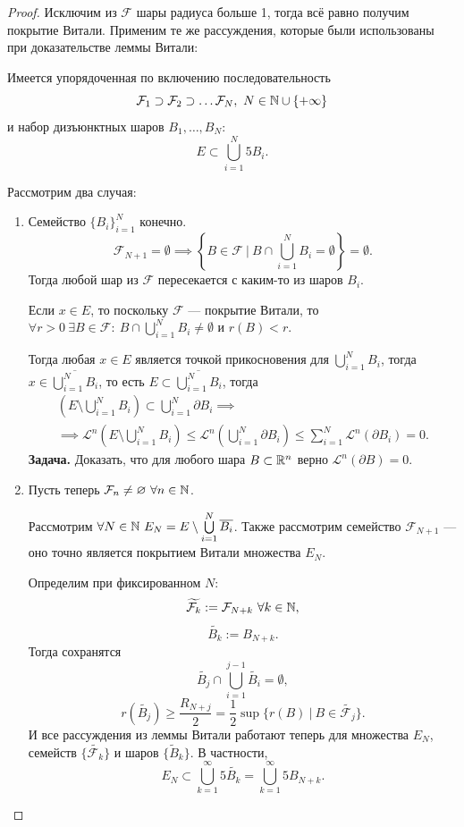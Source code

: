 \begin{proof}
    Исключим из $\mathcal{F}$ шары радиуса больше 1, тогда всё равно получим покрытие Витали.
    Применим те же рассуждения, которые были использованы при доказательстве леммы Витали:

    Имеется упорядоченная по включению последовательность
    \[\mathcal{F}_1 \supset \mathcal{F}_2 \supset \dots \mathcal{F}_N, \ N \in \mathbb{N} \cup \{+\infty\}\]
    и набор дизъюнктных шаров $B_1, \dots, B_N$:
    \[E \subset \bigcup\limits_{i=1}^{N} 5B_i.\]

    \noindent Рассмотрим два случая:
    \begin{enumerate}
        \item Семейство $\{B_i\}_{i=1}^N$ конечно.
        $$\mathcal{F}_{N+1} = \emptyset \implies \left\{B \in \mathcal{F} \ | \ B \cap \bigcup\limits_{i=1}^{N} B_i = \emptyset\right\} = \emptyset.$$
        Тогда любой шар из $\mathcal{F}$ пересекается с каким-то из шаров $B_i$.

        Если $x \in E$, то поскольку $\mathcal{F}$ — покрытие Витали, то $\forall r > 0 \ \exists B \in \mathcal{F}: \ B \cap \bigcup\limits_{i=1}^{N} B_i \neq \emptyset$ и $r(B) < r$.

        Тогда любая $x \in E$ является точкой прикосновения для $\bigcup\limits_{i=1}^{N}B_i$, тогда $x \in \overline{\bigcup\limits_{i=1}^{N}B_i}$, то есть $E \subset \overline{\bigcup\limits_{i=1}^{N}B_i}$, тогда
        \begin{multline*}
            \left(E \setminus \bigcup\limits_{i=1}^{N}B_i\right) \subset \bigcup\limits_{i=1}^{N} \partial B_i
            \implies\\\implies
            \mathcal{L}^n \left(E \setminus \bigcup\limits_{i=1}^{N}B_i\right) \leqslant \mathcal{L}^n \left(\bigcup\limits_{i=1}^{N} \partial B_i\right) \leqslant \sum\limits_{i=1}^{N} \mathcal{L}^n(\partial B_i) = 0.
        \end{multline*} 
        \noindent \textbf{Задача.} Доказать, что для любого шара $B \subset \mathbb{R}^n$ верно $\mathcal{L}^n(\partial B) = 0$.

        \item Пусть теперь $\mathcal{F}_n \neq \varnothing \ \forall n \in \mathbb{N}$.
        
        Рассмотрим $\forall N \in \mathbb{N} \ E_N = E \setminus \bigcup\limits_{i=1}^{N} \overline{B_i}$.
        Также рассмотрим семейство $\mathcal{F}_{N+1}$ — оно точно является покрытием Витали множества $E_N$.

        Определим при фиксированном $N$:
        \[\widetilde{\mathcal{F}_k} := \mathcal{F}_{N+k} \ \forall k \in \mathbb{N},\]
        \[\widetilde{B_k} := B_{N + k}.\]
        Тогда сохранятся
        \[\widetilde{B_j} \cap \bigcup\limits_{i=1}^{j-1} \widetilde{B_i} = \emptyset,\]
        \[r(\widetilde{B_j}) \geqslant \frac{R_{N+j}}{2} = \frac{1}{2} \sup\{r(B) \ | \ B \in \widetilde{\mathcal{F}_j}\}.\]
        И все рассуждения из леммы Витали работают теперь для множества $E_N$, семейств $\{\widetilde{\mathcal{F}_k}\}$ и шаров $\{\widetilde{B}_k\}$.
        В частности,
        \[E_N \subset \bigcup\limits_{k=1}^{\infty} 5 \widetilde{B_k} = \bigcup\limits_{k=1}^{\infty} 5B_{N+k}.\]
        

\end{enumerate}
\end{proof}

